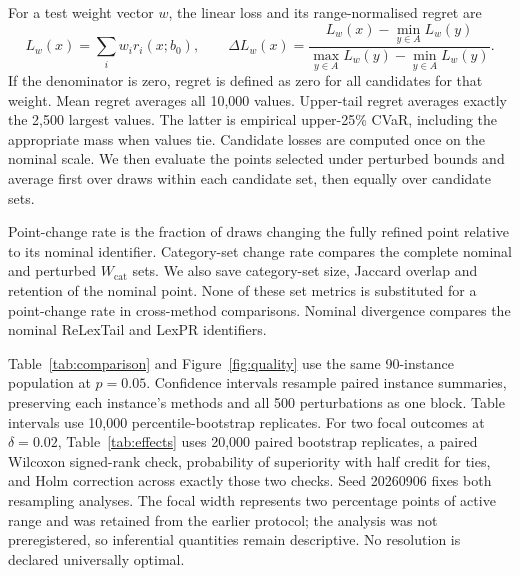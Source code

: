 For a test weight vector $w$, the linear loss and its range-normalised regret are
\begin{equation}
L_w(x)=\sum_iw_ir_i(x;b_0),\qquad
\Delta L_w(x)=\frac{L_w(x)-\min_{y\in A}L_w(y)}{\max_{y\in A}L_w(y)-\min_{y\in A}L_w(y)}.
\label{eq:external}
\end{equation}
If the denominator is zero, regret is defined as zero for all candidates for that weight. Mean regret averages all 10,000 values. Upper-tail regret averages exactly the 2,500 largest values. The latter is empirical upper-25\% CVaR, including the appropriate mass when values tie. Candidate losses are computed once on the nominal scale. We then evaluate the points selected under perturbed bounds and average first over draws within each candidate set, then equally over candidate sets.

Point-change rate is the fraction of draws changing the fully refined point relative to its nominal identifier. Category-set change rate compares the complete nominal and perturbed $W_{\mathrm{cat}}$ sets. We also save category-set size, Jaccard overlap and retention of the nominal point. None of these set metrics is substituted for a point-change rate in cross-method comparisons. Nominal divergence compares the nominal ReLexTail and LexPR identifiers.

Table~\ref{tab:comparison} and Figure~\ref{fig:quality} use the same 90-instance population at $p=0.05$. Confidence intervals resample paired instance summaries, preserving each instance's methods and all 500 perturbations as one block. Table intervals use 10,000 percentile-bootstrap replicates. For two focal outcomes at $\delta=0.02$, Table~\ref{tab:effects} uses 20,000 paired bootstrap replicates, a paired Wilcoxon signed-rank check, probability of superiority with half credit for ties, and Holm correction across exactly those two checks. Seed 20260906 fixes both resampling analyses. The focal width represents two percentage points of active range and was retained from the earlier protocol; the analysis was not preregistered, so inferential quantities remain descriptive. No resolution is declared universally optimal.

